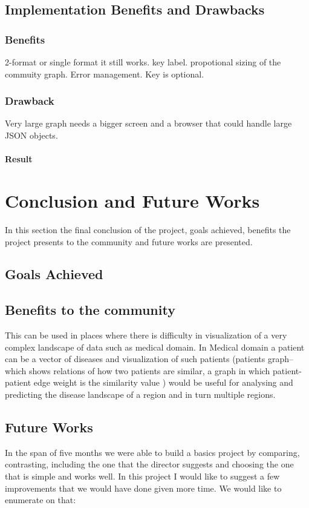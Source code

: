 \section{Implementation Benefits and Drawbacks}
\subsection{Benefits}
2-format or single format it still works.  key label. propotional sizing of the commuity graph. Error management. Key is optional.
\subsection{Drawback}
Very large graph needs a bigger screen and a browser that could handle large JSON objects.

\subsubsection{Result}

\chapter{Conclusion and Future Works}
In this section the final conclusion of the project, goals achieved, benefits the project presents to the community and future works are presented. 

\section{Goals Achieved}

\section{Benefits to the community}
This can be used in places where there is difficulty in visualization of a very complex landscape
of data such as medical domain. In Medical domain a patient can be a vector of diseases and
visualization of such patients (patients graph–which shows relations of how two patients are
similar, a graph in which patient-patient edge weight is the similarity value ) would be useful for
analysing and predicting the disease landscape of a region and in turn multiple regions.


\section{Future Works}
In the span of five months we were able to build a basics project by comparing, contrasting, including the one that the director suggests and choosing the one that is simple and works well. In this project I would like to suggest a few improvements that we would have done given more time. We would like to enumerate on that:

